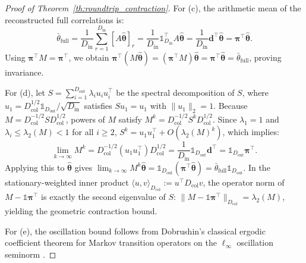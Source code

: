 \documentclass[default,sn-mathphys,Numbered]{sn-jnl}
\theoremstyle{thmstyleone}
\theoremstyle{thmstylethree}
\theoremstyle{thmstyletwo}
\newcommand{\inp}{\text{in}}
\newcommand{\outp}{\text{out}}
\begin{document}
\begin{appendices}
\begin{proof}[Proof of Theorem~\ref{th:roundtrip_contraction}]
For (c), the arithmetic mean of the reconstructed full correlations is:
\begin{equation}
\bar{\theta}_{\mathrm{full}} = \frac{1}{D_{\inp}} \sum_{r=1}^{D_{\inp}} [A \hat{\bm{\theta}}]_r = \frac{1}{D_{\inp}} \mathds{1}_{D_{\inp}}^\top A \hat{\bm{\theta}} = \frac{1}{D_{\inp}} \bm{d}^\top \hat{\bm{\theta}} = \bm{\pi}^\top \hat{\bm{\theta}}.
\end{equation}
Using $\bm{\pi}^\top M = \bm{\pi}^\top$, we obtain $\bm{\pi}^\top (M \hat{\bm{\theta}}) = (\bm{\pi}^\top M) \hat{\bm{\theta}} = \bm{\pi}^\top \hat{\bm{\theta}} = \bar{\theta}_{\mathrm{full}}$, proving invariance.

For (d), let $S = \sum_{i=1}^{D_{\outp}} \lambda_i u_i u_i^\top$ be the spectral decomposition of $S$, where $u_1 = D_{\mathrm{col}}^{1/2} \mathds{1}_{D_{\outp}} / \sqrt{D_{\inp}}$ satisfies $S u_1 = u_1$ with $\|u_1\|_2 = 1$.
Because $M = D_{\mathrm{col}}^{-1/2} S D_{\mathrm{col}}^{1/2}$, powers of $M$ satisfy $M^k = D_{\mathrm{col}}^{-1/2} S^k D_{\mathrm{col}}^{1/2}$.
Since $\lambda_1 = 1$ and $\lambda_i \le \lambda_2(M) < 1$ for all $i \ge 2$, $S^k = u_1 u_1^\top + O(\lambda_2(M)^k)$, which implies:
\begin{equation}
\lim_{k \to \infty} M^k = D_{\mathrm{col}}^{-1/2} (u_1 u_1^\top) D_{\mathrm{col}}^{1/2} = \frac{1}{D_{\inp}} \mathds{1}_{D_{\outp}} \bm{d}^\top = \mathds{1}_{D_{\outp}} \bm{\pi}^\top.
\end{equation}
Applying this to $\hat{\bm{\theta}}$ gives $\lim_{k \to \infty} M^k \hat{\bm{\theta}} = \mathds{1}_{D_{\outp}} (\bm{\pi}^\top \hat{\bm{\theta}}) = \bar{\theta}_{\mathrm{full}} \mathds{1}_{D_{\outp}}$.
In the stationary-weighted inner product $\langle u, v \rangle_{D_{\mathrm{col}}} := u^\top D_{\mathrm{col}} v$, the operator norm of $M - \mathds{1}\bm{\pi}^\top$ is exactly the second eigenvalue of $S$: $\|M - \mathds{1}\bm{\pi}^\top\|_{D_{\mathrm{col}}} = \lambda_2(M)$, yielding the geometric contraction bound.

For (e), the oscillation bound follows from Dobrushin's classical ergodic coefficient theorem for Markov transition operators on the $\ell_\infty$ oscillation seminorm \citep{dobrushin1956,seneta2006non}.
\end{proof}


\end{appendices}
\end{document}
